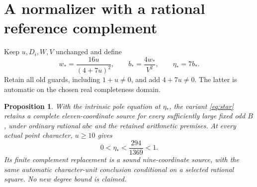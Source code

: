 \documentclass[11pt,a4paper]{article}
\newtheorem{proposition}[theorem]{Proposition}
\begin{document}
\section{A normalizer with a rational reference complement}
Keep $u,D_i,W,V$ unchanged and define
\begin{equation}\label{eq:star}
 w_* = \frac{16u}{(4+7u)^2},\qquad b_* = \frac{4w_*}{V^2},
 \qquad \eta_* = 7b_*.
\end{equation}
Retain all old guards, including $1+u\ne0$, and add $4+7u\ne0$.
The latter is automatic on the chosen real completeness domain.

\begin{proposition}\label{prop:star}
With the intrinsic pole equation at $\eta_*$, the variant
\eqref{eq:star} retains a complete eleven-coordinate source for every
sufficiently large fixed odd $B$, under ordinary rational $abc$ and
the retained arithmetic premises. At every actual point character,
$u\ge10$ gives
\[
                0<\eta_*<\frac{294}{1369}<1.
\]
Its finite complement replacement is a sound nine-coordinate source,
with the same automatic character-unit conclusion conditional on a
selected rational square. No new degree bound is claimed.
\end{proposition}
\end{document}
